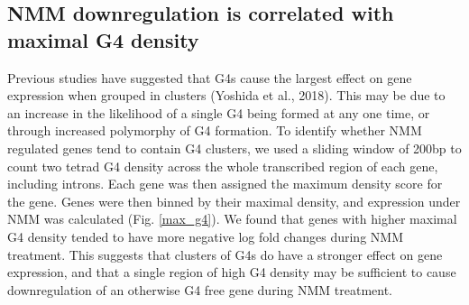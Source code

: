 \documentclass[12pt,a4paper,]{report}
\begin{document}
\newpage

\hypertarget{nmm-downregulation-is-correlated-with-maximal-g4-density}{%
\subsection{NMM downregulation is correlated with maximal G4
density}\label{nmm-downregulation-is-correlated-with-maximal-g4-density}}

Previous studies have suggested that G4s cause the largest effect on
gene expression when grouped in clusters (Yoshida et al., 2018). This
may be due to an increase in the likelihood of a single G4 being formed
at any one time, or through increased polymorphy of G4 formation. To
identify whether NMM regulated genes tend to contain G4 clusters, we
used a sliding window of 200bp to count two tetrad G4 density across the
whole transcribed region of each gene, including introns. Each gene was
then assigned the maximum density score for the gene. Genes were then
binned by their maximal density, and expression under NMM was calculated
(Fig. \ref{max_g4}). We found that genes with higher maximal G4 density
tended to have more negative log fold changes during NMM treatment. This
suggests that clusters of G4s do have a stronger effect on gene
expression, and that a single region of high G4 density may be
sufficient to cause downregulation of an otherwise G4 free gene during
NMM treatment.

\newpage
\end{document}
